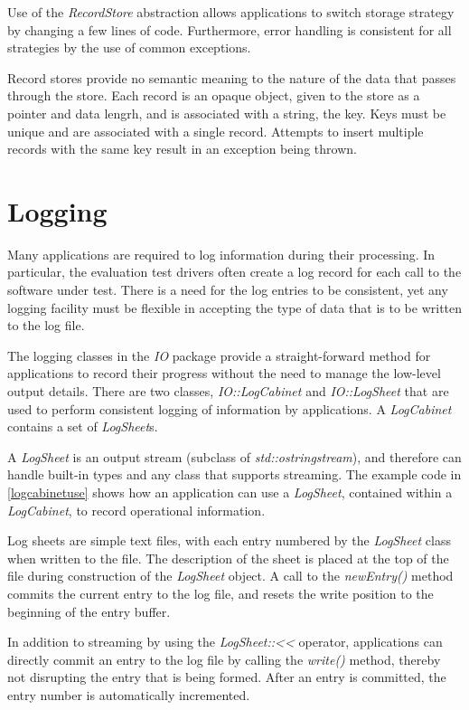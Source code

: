 Use of the {\em RecordStore} abstraction allows applications to switch
storage strategy by changing a few lines of code. Furthermore, error handling
is consistent for all strategies by the use of common exceptions.

Record stores provide no semantic meaning to the nature of the data that passes
through the store. Each record is an opaque object, given to the store as a
pointer and data lengrh, and is associated with a string, the key. Keys must
be unique and are associated with a single record. Attempts to insert multiple
records with the same key result in an exception being thrown.

\section{Logging}
\label{sec-logging}

Many applications are required to log information during their processing. In
particular, the evaluation test drivers often create a log record for each
call to the software under test. There is a need for the log entries to be
consistent, yet any logging facility must be flexible in accepting the type of
data that is to be written to the log file.

The logging classes in the {\em IO} package provide a straight-forward method
for applications to record their progress without the need to manage the
low-level output details.
There are two classes, {\em IO::LogCabinet} and {\em IO::LogSheet} that are used
to perform consistent logging of information by applications. A {\em LogCabinet}
contains a set of {\em LogSheet}s.

A {\em LogSheet} is an output stream (subclass of {\em std::ostringstream}),
and therefore can handle built-in types and any class that supports streaming.
The example code in \ref{logcabinetuse} shows how an application can use a
{\em LogSheet}, contained within a {\em LogCabinet}, to record operational
information.

Log sheets are simple text files, with each entry numbered by the {\em LogSheet}
class when written to the file. The description of the sheet is placed at the
top of the file during construction of the {\em LogSheet} object. A call to the
{\em newEntry()} method commits the current entry to the log file, and resets
the write position to the beginning of the entry buffer.

In addition to streaming by using the {\em LogSheet::<<} operator, applications
can directly commit an entry to the log file by calling the {\em write()}
method, thereby not disrupting the entry that is being formed. After an entry
is committed, the entry number is automatically incremented.

